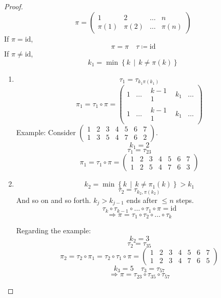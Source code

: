 \documentclass[a4paper,landscape,twocolumn]{article}
\newcommand\setdef[2]{\left\{#1\,\middle|\,#2\right\}}
\theoremstyle{definition}
\begin{document}
\begin{proof}
  \[
    \pi = \begin{pmatrix}
      1 & 2 & \ldots & n \\
      \pi(1) & \pi(2) & \ldots & \pi(n)
    \end{pmatrix}
  \]
  If $\pi = \text{id}$,
  \[ \pi = \pi \quad \tau \coloneqq \text{id} \]
  If $\pi \neq \text{id}$,
  \[ k_1 = \min\setdef{k}{k \neq \pi(k)} \]
  \begin{enumerate}
    \item
      \[ \tau_1 = \tau_{k_1 \pi(k_1)} \]
      \[
        \pi_1 = \tau_1 \circ \pi =
        \begin{pmatrix}
          1 & \ldots & \substack{k-1 \\ 1} & k_1 & \ldots \\
          1 & \ldots & \substack{k-1 \\ 1} & k_1 & \ldots
        \end{pmatrix}
      \]
      Example:
      Consider $\begin{pmatrix}
        1 & 2 & 3 & 4 & 5 & 6 & 7 \\
        1 & 3 & 5 & 4 & 7 & 6 & 2
      \end{pmatrix}$.
      \[ k_1 = 2 \]
      \[ \tau_1 = \tau_{23} \]
      \[
        \pi_1 = \tau_1 \circ \pi =
        \begin{pmatrix}
          1 & 2 & 3 & 4 & 5 & 6 & 7 \\
          1 & 2 & 5 & 4 & 7 & 6 & 3
        \end{pmatrix}
      \]
    \item
      \[ k_2 = \min\setdef{k}{k \neq \pi_1(k)} > k_1 \]
      \[ \tau_2 = \tau_{k_2,\pi(k_2)} \]
      And so on and so forth. $k_j > k_{j-1}$ ends after $\leq n$ steps.
      \[ \tau_k \circ \tau_{k-1} \circ \ldots \circ \tau_1 \circ \pi = \text{id} \]
      \[ \Rightarrow \pi = \tau_1 \circ \tau_2 \circ \ldots \circ \tau_k \]

      Regarding the example:
      \[ k_2 = 3 \]
      \[ \tau_2 = \tau_{35} \]
      \[
        \pi_2 = \tau_2 \circ \pi_1 = \tau_2 \circ \tau_1 \circ \pi =
        \begin{pmatrix}
          1 & 2 & 3 & 4 & 5 & 6 & 7 \\
          1 & 2 & 3 & 4 & 7 & 6 & 5
        \end{pmatrix}
      \]
      \[ k_3 = 5 \quad \tau_3 = \tau_{57} \]
      \[ \Rightarrow \pi = \tau_{23} \circ \tau_{35} \circ \tau_{57} \]
  \end{enumerate}
\end{proof}
\end{document}
